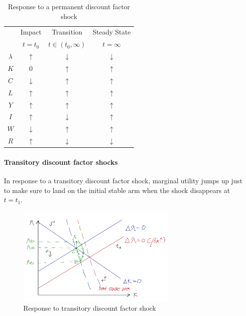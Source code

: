 \documentclass[11pt]{amsart}
\begin{document}
\begin{table}[H]
	\centering
	\begin{tabular}{cccc}
		\hline \hline 
		& Impact  & Transition            & Steady State \\
		& $t=t_0$ & $t \in (t_0, \infty)$ & $t = \infty$ \\
		\hline 
		$\lambda$ &   $\uparrow$      &   $\downarrow$   &   $\downarrow$     \\
		$K$           &   0                      &   $\uparrow$       &    $\uparrow$    \\
		$C$           &  $\downarrow$   &   $\uparrow$       &     $\uparrow$       \\
		$L$           &   $\uparrow$       &    $\uparrow$       &  $\uparrow$            \\
		$Y$           &   $\uparrow$       &     $\uparrow$      &   $\uparrow$           \\
		$I$            &   $\uparrow$       &  $\downarrow$   & $\uparrow$              \\
		$W$          &   $\downarrow$  &   $\uparrow$       &      $\uparrow$        \\
		$R$           &   $\uparrow$       &    $\downarrow$ &     $\downarrow$        \\
		\hline
	\end{tabular}
	\caption{Response to a permanent discount factor shock}
\end{table}
\paragraph{\bf Transitory discount factor shocks}
In response to a transitory discount factor shock, marginal utility jumps up just to make sure to land on the initial stable arm when the shock disappears at $t= t_1$. 
\begin{figure}[H]
	\centering
	\includegraphics[width=0.7\textwidth]{2_2_Minki.png}
	\caption{Response to transitory discount factor shock}
\end{figure}
\end{document}
